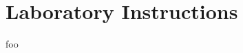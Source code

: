 \documentclass[10pt,a4paper,oneside]{book}
\begin{document}
\chapter{Laboratory Instructions}

foo
\end{document}
